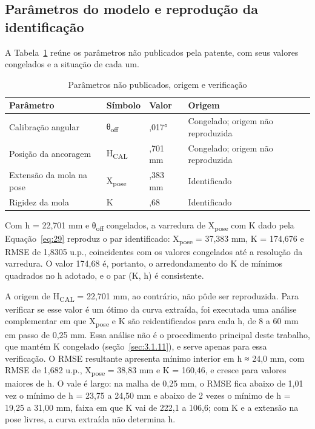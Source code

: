 \subsection{Parâmetros do modelo e reprodução da identificação}\label{sec:4.1.4}

A Tabela~\ref{tab:parametros-nao-publicados-origem} reúne os parâmetros não publicados pela patente, com seus valores congelados e a situação de cada um.

\begin{table}[!htbp]
\estilotabela{\small}
\caption{Parâmetros não publicados, origem e verificação}\label{tab:parametros-nao-publicados-origem}
\begin{tabularx}{\textwidth}{@{}>{\hsize=1.076\hsize\raggedright\arraybackslash}X>{\hsize=0.737\hsize\centering\arraybackslash}X>{\hsize=0.907\hsize\centering\arraybackslash}X>{\hsize=1.280\hsize\raggedright\arraybackslash}X@{}}
\toprule
\centering\textbf{Parâmetro} & \centering\textbf{Símbolo} & \centering\textbf{Valor} & \centering\textbf{Origem} \tabularnewline
\midrule
Calibração angular & θ\textsubscript{off} & 133,017° & Congelado; origem não reproduzida \\
Posição da ancoragem & H\textsubscript{CAL} & 22,701 mm & Congelado; origem não reproduzida \\
Extensão da mola na pose & X\textsubscript{pose} & 37,383 mm & Identificado \\
Rigidez da mola & K & 174,68 & Identificado \\
\bottomrule
\end{tabularx}
\end{table}

Com h = 22,701 mm e θ\textsubscript{off} congelados, a varredura de X\textsubscript{pose} com K dado pela Equação~\eqref{eq:29} reproduz o par identificado: X\textsubscript{pose} = 37,383 mm, K = 174,676 e RMSE de 1,8305 u.p., coincidentes com os valores congelados até a resolução da varredura. O valor 174,68 é, portanto, o arredondamento do K de mínimos quadrados no h adotado, e o par (K, h) é consistente.

A origem de H\textsubscript{CAL} = 22,701 mm, ao contrário, não pôde ser reproduzida. Para verificar se esse valor é um ótimo da curva extraída, foi executada uma análise complementar em que X\textsubscript{pose} e K são reidentificados para cada h, de 8 a 60 mm em passo de 0,25 mm. Essa análise não é o procedimento principal deste trabalho, que mantém K congelado (seção~\ref{sec:3.1.11}), e serve apenas para essa verificação. O RMSE resultante apresenta mínimo interior em h ≈ 24,0 mm, com RMSE de 1,682 u.p., X\textsubscript{pose} = 38,83 mm e K = 160,46, e cresce para valores maiores de h. O vale é largo: na malha de 0,25 mm, o RMSE fica abaixo de 1,01 vez o mínimo de h = 23,75 a 24,50 mm e abaixo de 2 vezes o mínimo de h = 19,25 a 31,00 mm, faixa em que K vai de 222,1 a 106,6; com K e a extensão na pose livres, a curva extraída não determina h. 

